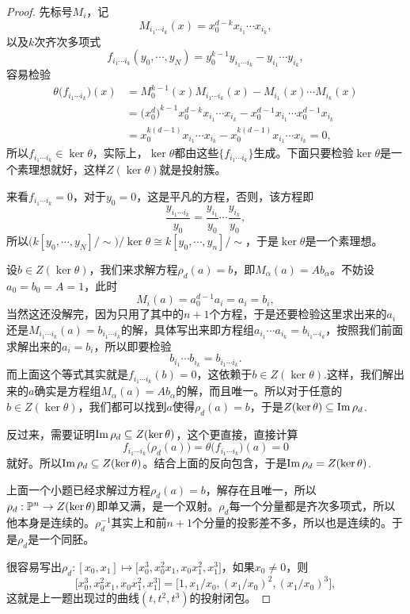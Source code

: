 \documentclass[9pt]{extarticle}
\theoremstyle{plain}%
\begin{document}
\begin{proof}
	 先标号$M_i$，记
	\[
		M_{i_1\cdots i_k}(x)=x_0^{d-k}x_{i_1}\cdots x_{i_k},
	\]
	以及$k$次齐次多项式
	\[
		f_{i_1\cdots i_k}(y_0,\cdots,y_N)=y_0^{k-1}y_{i_1\cdots i_k}-y_{i_1}\cdots y_{i_k},
	\]
	容易检验
	\begin{align*}
		\theta\bigl(f_{i_1\cdots i_k}\bigr)(x)&=M_0^{k-1}(x)M_{i_1\cdots i_k}(x)-M_{i_1}(x)\cdots M_{i_k}(x)\\
		&=\bigl(x_0^{d}\bigr)^{k-1}x_0^{d-k}x_{i_1}\cdots x_{i_k}-x_0^{d-1}x_{i_1}\cdots x_0^{d-1}x_{i_k}\\
		&=x_0^{k(d-1)}x_{i_1}\cdots x_{i_k}
		-x_0^{k(d-1)}x_{i_1}\cdots x_{i_k}=0,
	\end{align*}
	所以$f_{i_1\cdots i_k}\in \ker \theta$，实际上，$\ker \theta$都由这些$\bigl\{f_{i_1\cdots i_k}\bigr\}$生成。下面只要检验$\ker \theta$是一个素理想就好，这样$Z(\ker \theta)$就是投射簇。

	来看$f_{i_1\cdots i_k}=0$，对于$y_0=0$，这是平凡的方程，否则，该方程即
	\[
		\frac{y_{i_1\cdots i_k}}{y_0}=\frac{y_{i_1}}{y_0}\cdots \frac{y_{i_k}}{y_0},
	\]
	所以$\bigl(k[y_0,\cdots,y_N]/\sim\bigr)/\ker \theta \cong k[y_0,\cdots,y_n]/\sim$，于是$\ker \theta$是一个素理想。

	 设$b\in Z(\ker\theta)$，我们来求解方程$\rho_d(a)=b$，即$M_\alpha(a)=A b_\alpha$。不妨设$a_0=b_0=A=1$，此时
	\[
		M_i(a)=a_0^{d-1}a_i=a_i=b_i,
	\]
	当然这还没解完，因为只用了其中的$n+1$个方程，于是还要检验这里求出来的$a_i$还是$M_{i_1\cdots i_k}(a)=b_{i_1\cdots i_k}$的解，具体写出来即方程组$a_{i_1}\cdots a_{i_k}=b_{i_1\cdots i_k}$，按照我们前面求解出来的$a_i=b_i$，所以即要检验
	\[
		b_{i_1}\cdots b_{i_k}=b_{i_1\cdots i_k}.
	\]
	而上面这个等式其实就是$f_{i_1\cdots i_k}(b)=0$，这依赖于$b\in Z(\ker\theta)$.这样，我们解出来的$a$确实是方程组$M_\alpha(a)=A b_\alpha$的解，而且唯一。所以对于任意的$b\in Z(\ker\theta)$，我们都可以找到$a$使得$\rho_d(a)=b$，于是$Z(\ker \theta)\subseteq \operatorname{Im} \rho_d$.

	反过来，需要证明$\operatorname{Im} \rho_d\subseteq Z(\ker \theta)$，这个更直接，直接计算
	\[
		f_{i_1\cdots i_k}\bigl(\rho_d(a)\bigr)=\theta\bigl(f_{i_1\cdots i_k}\bigr)(a)=0
	\]
	就好。所以$\operatorname{Im} \rho_d\subseteq Z(\ker \theta)$。结合上面的反向包含，于是$\operatorname{Im} \rho_d=Z(\ker \theta)$.

	 上面一个小题已经求解过方程$\rho_d(a)=b$，解存在且唯一，所以$\rho_d:\mathbb{P}^{n}\to Z(\ker \theta)$即单又满，是一个双射。$\rho_d$每一个分量都是齐次多项式，所以他本身是连续的。$\rho_d^{-1}$其实上和前$n+1$个分量的投影差不多，所以也是连续的。于是$\rho_d$是一个同胚。

	 很容易写出$\rho_d:[x_0,x_1]\mapsto \bigl[x_0^3,x_0^2x_1,x_0x_1^2,x_1^3\bigr]$，如果$x_0\neq 0$，则
	\[
		\bigl[x_0^3,x_0^2x_1,x_0x_1^2,x_1^3\bigr]=\bigl[1,x_1/x_0,(x_1/x_0)^2,(x_1/x_0)^3\bigr],
	\]
	这就是上一题出现过的曲线$(t,t^2,t^3)$的投射闭包。
\end{proof}
\end{document}

